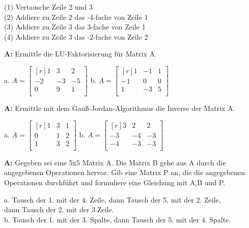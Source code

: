 \documentclass[landscape,twocolumn,a4paper]{article}
\begin{document}
 (1) Vertausche Zeile 2 und 3 \\
 (2)  Addiere zu Zeile 2 das -4-fache von Zeile 1 \\
 (3) Addiere zu Zeile 3 das 3-fache von Zeile 1  \\
 (4) Addiere zu Zeile 3 das -2-fache von Zeile 2
 \vspace{10pt}

\bigskip {}

\textbf{A:}   
Ermittle die LU-Faktorisierung für Matrix A.

a.  $A =\begin{bmatrix*}[r] 1 & 3 & 2\\  -2 & -3 & -5\\ 0 & 9 & 1\\ \end{bmatrix*}$  \quad 
b.  $A =\begin{bmatrix*}[r] 1 & -1 & 1\\  -1 & 0 & 0\\ 1 &-3 & 5\\ \end{bmatrix*}$  \quad 

\bigskip {}

\textbf{A:}   
Ermittle mit dem Gauß-Jordan-Algorithmus die Inverse der Matrix  A.

a.  $A =\begin{bmatrix*}[r] 1 & 3 & 1\\  0 & 1 & 2\\ 1 & 3 & 2\\ \end{bmatrix*}$  \quad 
b.  $A =\begin{bmatrix*}[r] 3 & 2 & 2\\  -3 & -4 & -3\\ -4 & -3 & -3\\ \end{bmatrix*}$  \quad \\
\bigskip {}

\textbf{A:}   
Gegeben sei eine 5x5  Matrix A. Die Matrix B gehe aus A durch die angegebenen Operationen hervor. 
Gib eine Matrix P an, die die angegebenen Operationen durchführt und formuliere eine Gleichung mit A,B und P.


a. Tausch der 1. mit der 4. Zeile, dann Tausch der 5. mit der 2. Zeile, \\
dann Tausch der 2. mit der 3.Zeile. \\
b. Tausch der 1. mit der 3. Spalte, dann Tausch der 5. mit der 4. Spalte.
\end{document}
